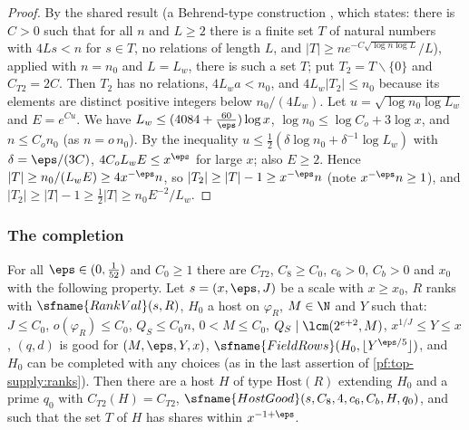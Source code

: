 \begin{proof}
By the shared result  (a Behrend-type construction \cite{Behrend1946},
which states: there is $C>0$ such that for all $n$ and $L\ge2$ there is a finite set $T$ of natural numbers with $4Ls<n$ for
$s\in T$, no relations of length $L$, and $|T|\ge ne^{-C\sqrt{\log n\log L}}/L$), applied with $n=n_0$ and $L=L_w$, there is
such a set $T$; put $T_2=T\smallsetminus\{0\}$ and $C_{T2}=2C$. Then $T_2$ has no relations, $4L_wa<n_0$, and $4L_w|T_2|\le n_0$
because its elements are distinct positive integers below $n_0/(4L_w)$. Let $u=\sqrt{\log n_0\log L_w}$ and $E=e^{Cu}$. We have
$L_w\le(4084+\frac{60}\eps)\log x$, $\log n_0\le\log C_o+3\log x$, and $n\le C_on_0$ (as $n=o\,n_0$). By the inequality
$u\le\frac12(\delta\log n_0+\delta^{-1}\log L_w)$ with $\delta=\eps/(3C)$,
$4C_oL_wE\le x^{\eps}$ for large $x$; also $E\ge2$. Hence $|T|\ge n_0/(L_wE)\ge4x^{-\eps}n$, so
$|T_2|\ge|T|-1\ge x^{-\eps}n$ (note $x^{-\eps}n\ge1$), and $|T_2|\ge|T|-1\ge\frac12|T|\ge n_0E^{-2}/L_w$.
\end{proof}

\subsubsection{The completion}

\begin{proposition}\label{pf:top-supply:hostoffield}
For all $\eps\in(0,\frac1{52})$ and $C_0\ge1$ there are $C_{T2}$, $C_8\ge C_0$, $c_6>0$, $C_b>0$ and $x_0$ with the following
property. Let $s=(x,\eps,J)$ be a scale with $x\ge x_0$, $R$ ranks with $\sfname{RankVal}(s,R)$, $H_0$ a host on $\varphi_R$,
$M\in\N$ and $Y$ such that: $J\le C_0$, $o(\varphi_R)\le C_0$, $Q_S\le C_0n$, $0<M\le C_0$, $Q_S\mid\lcm(2^{e+2},M)$,
$x^{1/J}\le Y\le x$, $(q,d)$ is good for $(M,\eps,Y,x)$, $\sfname{FieldRows}(H_0,\lfloor Y^{\eps/5}\rfloor)$, and $H_0$ can be
completed with any choices (as in the last assertion of \cref{pf:top-supply:ranks}). Then there are a host $H$ of type
$\mathrm{Host}(R)$ extending $H_0$ and a prime $q_0$ with $C_{T2}(H)=C_{T2}$, $\sfname{HostGood}(s,C_8,4,c_6,C_b,H,q_0)$, and such
that the set $T$ of $H$ has shares within $x^{-1+\eps}$.
 
\end{proposition}

